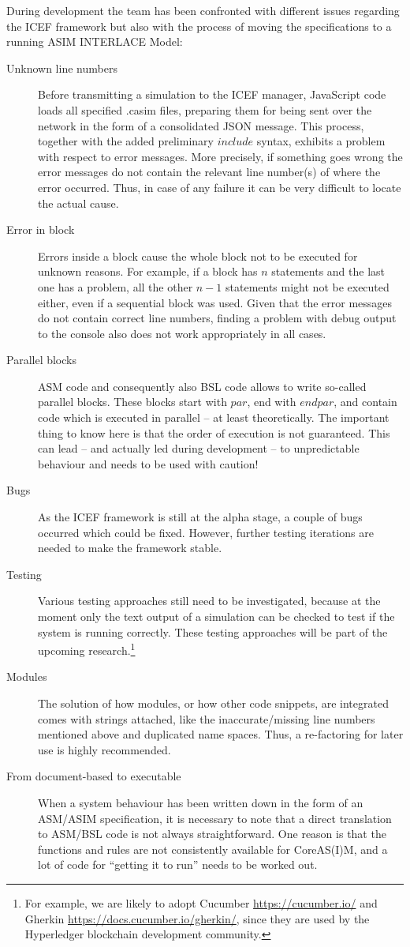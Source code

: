 During development the team has been confronted with different issues regarding the ICEF framework but also with the process of moving the specifications to a running ASIM INTERLACE Model:
\begin{description}
	\item[Unknown line numbers] Before transmitting a simulation to the ICEF manager, JavaScript code loads all specified .casim files, preparing them for being sent over the network in the form of a consolidated JSON message. This process, together with the added preliminary $include$ syntax, exhibits a problem with respect to error messages. More precisely, if something goes wrong the error messages do not contain the relevant line number(s) of where the error occurred. Thus, in case of any failure it can be very difficult to locate the actual cause.
	\item[Error in block] Errors inside a block cause the whole block not to be executed for unknown reasons. For example, if a block has $n$ statements and the last one has a problem, all the other $n - 1$ statements might not be executed either, even if a sequential block was used. Given that the error messages do not contain correct line numbers, finding a problem with debug output to the console also does not work appropriately in all cases.
	\item[Parallel blocks] ASM code and consequently also BSL code allows to write so-called parallel blocks. These blocks start with $par$, end with $endpar$, and contain code which is executed in parallel -- at least theoretically. The important thing to know here is that the order of execution is not guaranteed. This can lead -- and actually led during development -- to unpredictable behaviour and needs to be used with caution!
	\item[Bugs] As the ICEF framework is still at the alpha stage, a couple of bugs occurred which could be fixed. However, further testing iterations are needed to make the framework stable.
	\item[Testing] Various testing approaches still need to be investigated, because at the moment only the text output of a simulation can be checked to test if the system is running correctly. These testing approaches will be part of the upcoming research.\footnote{For example, we are likely to adopt Cucumber \url{https://cucumber.io/} and Gherkin \url{https://docs.cucumber.io/gherkin/}, since they are used by the Hyperledger blockchain development community.}
	\item[Modules] The solution of how modules, or how other code snippets, are integrated comes with strings attached, like the inaccurate/missing line numbers mentioned above and duplicated name spaces. Thus, a re-factoring for later use is highly recommended.
	\item[From document-based to executable] When a system behaviour has been written down in the form of an ASM/ASIM specification, it is necessary to note that a direct translation to ASM/BSL code is not always straightforward. One reason is that the functions and rules are not consistently available for CoreAS(I)M, and a lot of code for ``getting it to run'' needs to be worked out.
\end{description}

